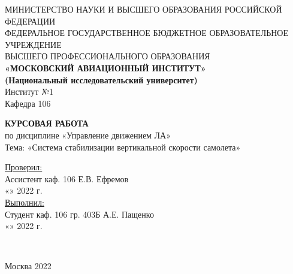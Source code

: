 \begin{center}
    \hfill \break
    \large{МИНИСТЕРСТВО НАУКИ И ВЫСШЕГО ОБРАЗОВАНИЯ РОССИЙСКОЙ ФЕДЕРАЦИИ }\\
    \footnotesize{ФЕДЕРАЛЬНОЕ ГОСУДАРСТВЕННОЕ БЮДЖЕТНОЕ ОБРАЗОВАТЕЛЬНОЕ УЧРЕЖДЕНИЕ}\\ 
    \footnotesize{ВЫСШЕГО ПРОФЕССИОНАЛЬНОГО ОБРАЗОВАНИЯ}\\
    \small{\textbf{«МОСКОВСКИЙ АВИАЦИОННЫЙ ИНСТИТУТ»\\(Национальный исследовательский университет)}}\\ \hline
    \hfill \break
    \normalsize{Институт №1}\\
    \normalsize{Кафедра 106}\\
    \hfill\break

    \large{\textbf{КУРСОВАЯ РАБОТА} \\ по дисциплине «Управление движением ЛА» }\\

    \normalsize{Тема: «Система стабилизации вертикальной скорости самолета»}\\
\end{center}
\hfill \break

\normalsize{ 
\begin{flushleft}
    \underline{Проверил:} \\
    \hfill \break  
    Ассистент каф. 106 Е.В. Ефремов \\ \hfill \break
    «\underline{\hspace{1cm}}» \underline{\hspace{3cm}} 2022 г. \\ \hfill \break
    \underline{Выполнил:} \\ \hfill \break 
    Студент каф. 106 гр. 403Б А.Е. Пащенко \\
    «\underline{\hspace{1cm}}» \underline{\hspace{3cm}} 2022 г. \\ \hfill \break
\end{flushleft}
}\\

\begin{center} Москва 2022 \end{center}
\thispagestyle{empty} %
 
